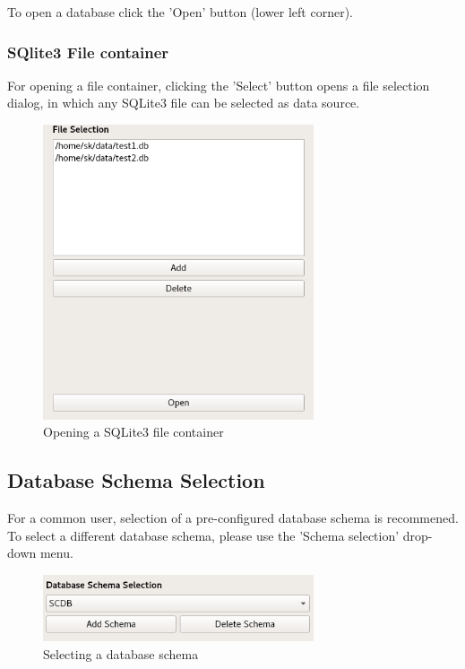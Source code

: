 \documentclass[10pt,letterpaper,extrafontsizes]{memoir}
\begin{document}
To open a database click the 'Open' button (lower left corner).

\subsubsection{SQlite3 File container}
For opening a file container, clicking the 'Select' button opens a file selection dialog, in which any SQLite3 file can be selected as data source.

\begin{figure}[H]
  \center
    \includegraphics[width=8cm]{../screenshots/sqlite3_open.png}
  \caption{Opening a SQLite3 file container}
  \label{fig:sqlite3_open}
\end{figure}

\subsection{Database Schema Selection}
For a common user, selection of a pre-configured database schema is recommened. To select a different database schema, please use the 'Schema selection' drop-down menu.\\

\begin{figure}[H]
  \center
    \includegraphics[width=8cm]{../screenshots/database_schema_selection.png}
  \caption{Selecting a database schema}
  \label{fig:db_schema_select}
\end{figure}
\end{document}
